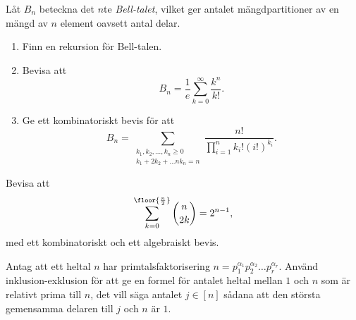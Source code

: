 \documentclass[nobib]{tufte-handout}
\begin{document}
\begin{xca}
    Låt $B_n$ beteckna det $n$te \emph{Bell-talet}, vilket ger antalet mängdpartitioner av en mängd av $n$ element oavsett antal delar.

    \begin{enumerate}[label = \roman*)]
        \item Finn en rekursion för Bell-talen.
        \item Bevisa att
        $$B_n = \frac{1}{e}\sum_{k = 0}^{\infty} \frac{k^n}{k!}.$$
        \item Ge ett kombinatoriskt bevis för att
        $$B_n = \sum_{\substack{k_1, k_2, \ldots, k_n \geq 0\\k_1 + 2k_2 + \ldots nk_n = n}} \frac{n!}{\prod_{i=1}^{n} k_i!(i!)^{k_i}}.$$
    \end{enumerate}
\end{xca}

\begin{xca}
    Bevisa att
    $$\sum_{k = 0}^{\floor{\frac{n}{2}}} \binom{n}{2k} = 2^{n-1},$$
    med ett kombinatoriskt och ett algebraiskt bevis.
\end{xca}

\begin{xca}
    Antag att ett heltal $n$ har primtalsfaktorisering $n = p_1^{\alpha_1}p_2^{\alpha_2}\ldots p_r^{\alpha_r}$. Använd inklusion-exklusion för att ge en formel för antalet heltal mellan $1$ och $n$ som är relativt prima till $n$, det vill säga antalet $j \in [n]$ sådana att den största gemensamma delaren till $j$ och $n$ är $1$.
\end{xca}

%
%
\end{document}

